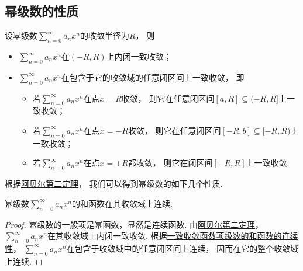 \subsection{幂级数的性质}
\begin{theorem}[阿贝尔第二定理]\label{theorem:无穷级数.阿贝尔定理2}
\def\labelitemii{$\triangleright$}%
设幂级数\(\sum_{n=0}^\infty a_n x^n\)的收敛半径为\(R\)，
则\begin{itemize}
	\item \(\sum_{n=0}^\infty a_n x^n\)在\((-R,R)\)上内闭一致收敛；
	\item \(\sum_{n=0}^\infty a_n x^n\)在包含于它的收敛域的任意闭区间上一致收敛，
	即\begin{itemize}
		\item 若\(\sum_{n=0}^\infty a_n x^n\)在点\(x=R\)收敛，
		则它在任意闭区间\([a,R]\subseteq(-R,R]\)上一致收敛；
		\item 若\(\sum_{n=0}^\infty a_n x^n\)在点\(x=-R\)收敛，
		则它在任意闭区间\([-R,b]\subseteq[-R,R)\)上一致收敛；
		\item 若\(\sum_{n=0}^\infty a_n x^n\)在点\(x=\pm R\)都收敛，
		则它在闭区间\([-R,R]\)上一致收敛.
	\end{itemize}
\end{itemize}
\end{theorem}

根据\hyperref[theorem:无穷级数.阿贝尔定理2]{阿贝尔第二定理}，
我们可以得到幂级数的如下几个性质.

\begin{property}\label{theorem:无穷级数.幂级数的和函数的性质1}
幂级数\(\sum_{n=0}^\infty a_n x^n\)的和函数在其收敛域上连续.
\begin{proof}
幂级数的一般项是幂函数，显然是连续函数.
由\hyperref[theorem:无穷级数.阿贝尔定理2]{阿贝尔第二定理}，
\(\sum_{n=0}^\infty a_n x^n\)在其收敛域上内闭一致收敛.
根据\hyperref[theorem:函数项级数.连续函数项级数的内闭一致收敛性保证和函数的连续性]{一致收敛函数项级数的和函数的连续性}，
\(\sum_{n=0}^\infty a_n x^n\)在包含于收敛域中的任意闭区间上连续，
因而在它的整个收敛域上连续.
\end{proof}
\end{property}

